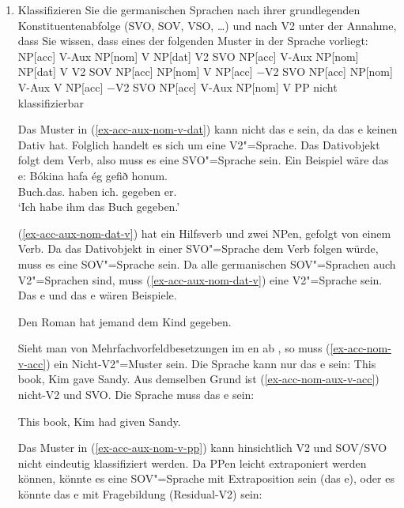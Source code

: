 \begin{enumerate}
\item Klassifizieren Sie die germanischen Sprachen nach ihrer grundlegenden Konstituentenabfolge (SVO, SOV, VSO,
  \ldots) und nach V2 unter der Annahme, dass Sie wissen, dass eines der folgenden Muster in der Sprache vorliegt:
\eal
\label{ex-v2-task-solution}
\ex 
\label{ex-acc-aux-nom-v-dat}
NP[acc] V-Aux NP[nom] V NP[dat]   \hfill  V2 SVO 
\ex
\label{ex-acc-aux-nom-dat-v} 
NP[acc] V-Aux NP[nom] NP[dat] V   \hfill  V2 SOV
\ex 
\label{ex-acc-nom-v-acc}
NP[acc] NP[nom] V NP[acc]         \hfill $-$V2 SVO
\ex 
\label{ex-acc-nom-aux-v-acc}
NP[acc] NP[nom] V-Aux V NP[acc]   \hfill $-$V2 SVO
\ex 
\label{ex-acc-aux-nom-v-pp}
NP[acc] V-Aux NP[nom] V PP        \hfill nicht klassifizierbar
\zl

\noindent
Das Muster in (\ref{ex-acc-aux-nom-v-dat}) kann nicht das e sein, da das e keinen Dativ hat. Folglich handelt es sich um eine V2"=Sprache.
Das Dativobjekt folgt dem Verb, also muss es eine SVO"=Sprache sein. Ein Beispiel wäre das e:
\ea
\gll Bókina          hafa ég       gefið honum.\\
     Buch.das.\ACC{} haben ich.\NOM{} gegeben er.\DAT\\\icelandic
\glt `Ich habe ihm das Buch gegeben.'
\z

(\ref{ex-acc-aux-nom-dat-v}) hat ein Hilfsverb und zwei NPen, gefolgt von einem Verb. Da das Dativobjekt in einer
SVO"=Sprache dem Verb folgen würde, muss es eine SOV"=Sprache sein. Da alle germanischen SOV"=Sprachen auch V2"=Sprachen
sind, muss (\ref{ex-acc-aux-nom-dat-v}) eine V2"=Sprache sein. Das e und das e wären Beispiele.

\ea Den Roman hat jemand dem Kind gegeben.
\z

Sieht man von Mehrfachvorfeldbesetzungen im en ab \citep{Mueller2003b}, so muss (\ref{ex-acc-nom-v-acc}) ein Nicht-V2"=Muster sein. Die Sprache kann nur das
e sein:
\ea
This book, Kim gave Sandy.
\z
Aus demselben Grund ist (\ref{ex-acc-nom-aux-v-acc}) nicht-V2 und SVO. Die Sprache muss das e sein:

\ea
This book, Kim had given Sandy.
\z

\noindent
Das Muster in (\ref{ex-acc-aux-nom-v-pp}) kann hinsichtlich V2 und
SOV/SVO nicht eindeutig klassifiziert werden. Da PPen leicht extraponiert werden können, könnte es
eine SOV"=Sprache mit Extraposition sein (\zb das e), oder es könnte das e mit Fragebildung (Residual-V2) sein:


\end{enumerate}

